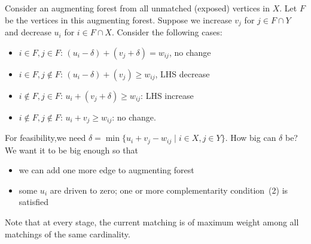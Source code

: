 Consider an augmenting forest from all unmatched (exposed) vertices in $X$. Let $F$ be the vertices in this augmenting forest.
Suppose we increase $v_j$ for $j\in F\cap Y$ and decrease $u_i$ for $i\in F\cap X$. 
Consider the following cases:
\begin{itemize}
\item
$i\in F,j\in F$: $(u_i-\delta)+(v_j+\delta)=w_{ij}$, no change
\item
$i\in F,j\notin F$: $(u_i-\delta)+(v_j)\ge w_{ij}$, LHS decrease
\item
$i\notin F,j\in F$: $u_i+(v_j+\delta)\ge w_{ij}$: LHS increase
\item
$i\notin F,j\notin F$: $u_i+v_j\ge w_{ij}$: no change.
\end{itemize}
For feasibility,we need $\delta=\min\{u_i+v_j-w_{ij}\mid i\in X,j\in Y\}$.
How big can $\delta$ be? We want it to be big enough so that
\begin{itemize}
\item
we can add one more edge to augmenting forest
\item
some $u_i$ are driven to zero; one or more complementarity condition~(2) is satisfied
\end{itemize}
Note that at every stage, the current matching is of maximum weight among all matchings of the same cardinality.

